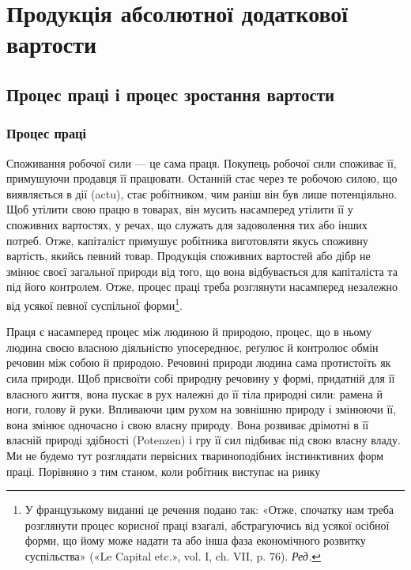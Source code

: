 
\chapter{Продукція абсолютної додаткової вартости}

\section[Процес праці і процес зростання вартости]{Процес праці і процес зростання вартости\footnotemarkZ{}}
\subsection{Процес праці}

Споживання робочої сили — це сама праця. Покупець робочої
сили споживає її, примушуючи продавця її працювати. Останній
стає через те робочою силою, що виявляється в дії (actu),
стає робітником, чим раніш він був лише потенціяльно. Щоб
утілити свою працю в товарах, він мусить насамперед утілити
її у споживних вартостях, у речах, що служать для задоволення
тих або інших потреб. Отже, капіталіст примушує робітника
виготовляти якусь споживну вартість, якийсь певний товар.
Продукція споживних вартостей або дібр не змінює своєї загальної
природи від того, що вона відбувається для капіталіста та
під його контролем. Отже, процес праці треба розглянути насамперед
незалежно від усякої певної суспільної форми\footnote*{
У французькому виданні це речення подано так: «Отже, спочатку
нам треба розглянути процес корисної праці взагалі, абстрагуючись
від усякої осібної форми, що йому може надати та або інша фаза економічного
розвитку суспільства» («Le Capital etc.», vol. I, ch. VII, p. 76). \emph{Ред.}
}.

Праця є насамперед процес між людиною й природою, процес,
що в ньому людина своєю власною діяльністю упосереднює, реґулює
й контролює обмін речовин між собою й природою. Речовині
природи людина сама протистоїть як сила природи. Щоб
присвоїти собі природну речовину у формі, придатній для її власного
життя, вона пускає в рух належні до її тіла природні сили:
рамена й ноги, голову й руки. Впливаючи цим рухом на зовнішню
природу і змінюючи її, вона змінює одночасно і свою власну природу.
Вона розвиває дрімотні в її власній природі здібності (Potenzen)
і гру її сил підбиває під свою власну владу. Ми не будемо
тут розглядати первісних твариноподібних інстинктивних форм
праці. Порівняно з тим станом, коли робітник виступає на ринку
\parbreak{}  %
